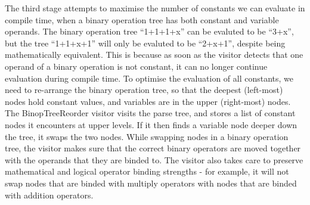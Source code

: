 \documentclass[11pt]{article}
\begin{document}
The third stage attempts to maximise the number of constants we can evaluate in compile time, when a binary operation tree has both constant and variable operands. The binary operation tree ``1+1+1+x'' can be evaluted to be ``3+x'', but the tree ``1+1+x+1'' will only be evaluted to be ``2+x+1'', despite being mathematically equivalent. This is because as soon as the visitor detects that one operand of a binary operation is not constant, it can no longer continue evaluation during compile time. To optimise the evaluation of all constants, we need to re-arrange the binary operation tree, so that the deepest (left-most) nodes hold constant values, and variables are in the upper (right-most) nodes. The BinopTreeReorder visitor visits the parse tree, and stores a list of constant nodes it encounters at upper levels. If it then finds a variable node deeper down the tree, it swaps the two nodes. While swapping nodes in a binary operation tree, the visitor makes sure that the correct binary operators are moved together with the operands that they are binded to. The visitor also takes care to preserve mathematical and logical operator binding strengths - for example, it will not swap nodes that are binded with multiply operators with nodes that are binded with addition operators.
\end{document}
